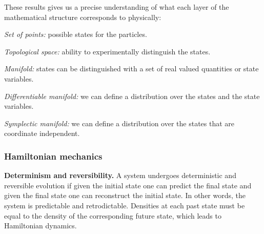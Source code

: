 \documentclass[twocolumn]{article}
\begin{document}
These results gives us a precise understanding of what each layer of the mathematical structure corresponds to physically:
\begin{description}[noitemsep]
	\item \emph{Set of points:} possible states for the particles.
	\item \emph{Topological space:} ability to experimentally distinguish the states.
	\item \emph{Manifold:} states can be distinguished with a set of real valued quantities or state variables.
	\item \emph{Differentiable manifold:} we can define a distribution over the states and the state variables.
	\item \emph{Symplectic manifold:} we can define a distribution over the states that are coordinate independent.
\end{description}

\subsubsection{Hamiltonian mechanics}

\textbf{Determinism and reversibility.} A system undergoes deterministic and reversible evolution if given the initial state one can predict the final state and given the final state one can reconstruct the initial state. In other words, the system is predictable and retrodictable. Densities at each past state must be equal to the density of the corresponding future state, which leads to Hamiltonian dynamics.
\end{document}

